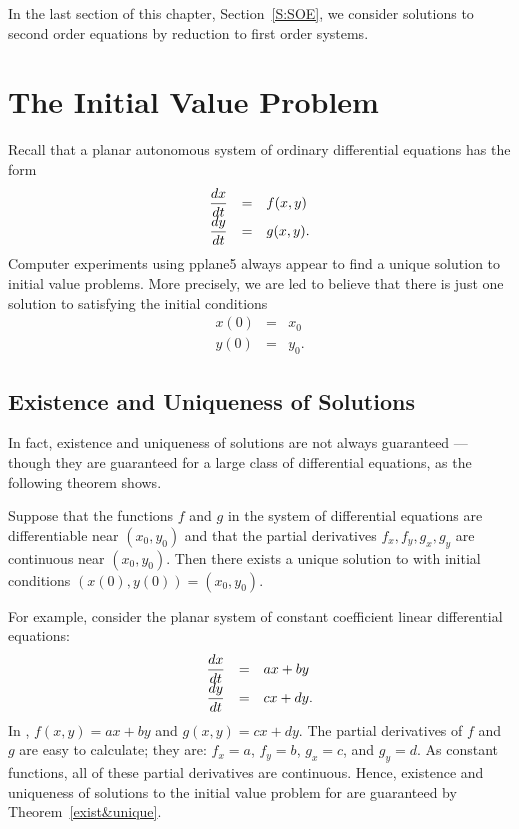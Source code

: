 In the last section of this chapter, Section~\ref{S:SOE}, we consider
solutions to second order equations by reduction to first order systems.


\section{The Initial Value Problem} 
\label{S:6.1}

Recall that a planar autonomous  system of
ordinary differential equations has the form
\arraystart
\begin{equation}  \label{2dsystem}
\begin{array}{ccl}
\displaystyle \frac{dx}{dt}  & = & f(x,y) \\
\displaystyle \frac{dy}{dt}  & = & g(x,y).
\end{array}
\end{equation}
\arrayfinish
Computer experiments using {\sf pplane5} always appear to find a unique
solution to initial value problems.  More precisely, we are led to
believe that there is just one solution to  satisfying
the initial conditions
\begin{eqnarray*}
x(0) & = & x_0 \\
y(0) & = & y_0.
\end{eqnarray*}

\subsection*{Existence and Uniqueness of Solutions}

In fact, existence  and uniqueness
of solutions  are not always guaranteed
--- though they are guaranteed for a large class of differential
equations, as the following theorem shows.

\begin{thm}  \label{exist&unique}
Suppose that the functions $f$ and $g$ in the system of
differential equations  are differentiable near
$(x_0,y_0)$ and that the partial derivatives $f_x,f_y,g_x,g_y$
are continuous near $(x_0,y_0)$.  Then there exists a unique
solution to  with initial conditions
$(x(0),y(0))=(x_0,y_0)$.
\end{thm} 

For example, consider the planar system of constant coefficient linear
differential equations:
\arraystart
\begin{equation}  \label{2dlinsystem}
\begin{array}{ccl}
\displaystyle \frac{dx}{dt}  & = & ax+by \\
\displaystyle \frac{dy}{dt}  & = & cx+dy.
\end{array}
\end{equation}
\arrayfinish
In , $f(x,y)=ax+by$ and $g(x,y)=cx+dy$.  The partial
derivatives of $f$ and $g$ are easy to calculate; they are: $f_x=a$, $f_y=b$,
$g_x=c$, and $g_y=d$.  As constant functions, all of these partial
derivatives are continuous.  Hence, existence and uniqueness of solutions to
the initial value problem for  are guaranteed by
Theorem~\ref{exist&unique}.


